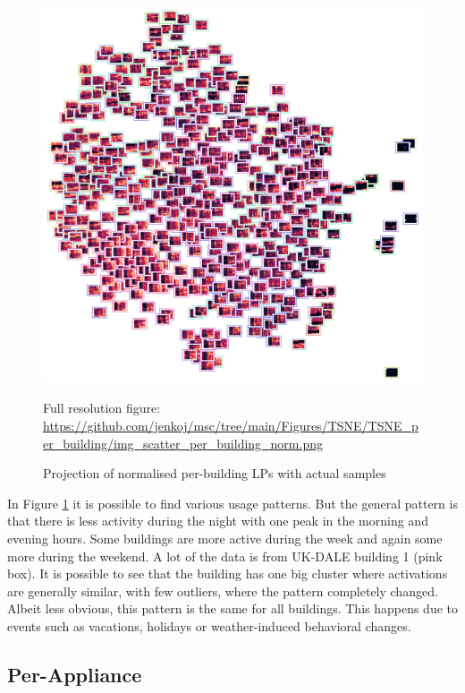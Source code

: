 \begin{figure}[H]
	\centering
	\caption{Projection of normalised per-building LPs with actual samples}
	\includegraphics[width=.9\textwidth]{Figures/TSNE/TSNE_per_building/img_scatter_per_building_norm.png}
	\label{fig:tsne_pb_img_norm_scatter_allall}
	\par
	\par\footnotesize{Full resolution figure: \url{https://github.com/jenkoj/msc/tree/main/Figures/TSNE/TSNE_per_building/img_scatter_per_building_norm.png}}
\end{figure}

In Figure \ref{fig:tsne_pb_img_norm_scatter_allall} it is possible to find various usage patterns. 
But the general pattern is that there is less activity during the night with one peak in the morning and evening hours.
Some buildings are more active during the week and again some more during the weekend.
A lot of the data is from UK-DALE building 1 (pink box). 
It is possible to see that the building has one big cluster where activations are generally similar, with few outliers, where the pattern completely changed. 
Albeit less obvious, this pattern is the same for all buildings.
This happens due to events such as vacations, holidays or weather-induced behavioral changes.

\subsection{Per-Appliance}

